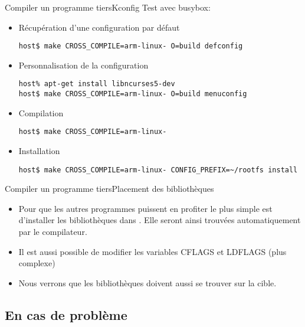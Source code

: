 \begin{frame}[fragile=singleslide]{Compiler un programme tiers}{Kconfig}
  Test avec busybox:
  \begin{itemize}
  \item Récupération d'une configuration par défaut
\begin{lstlisting}
host$ make CROSS_COMPILE=arm-linux- O=build defconfig
\end{lstlisting} %
  \item Personnalisation de la configuration
\begin{lstlisting}
host% apt-get install libncurses5-dev
host$ make CROSS_COMPILE=arm-linux- O=build menuconfig
\end{lstlisting} %
  \item Compilation
\begin{lstlisting}
host$ make CROSS_COMPILE=arm-linux-
\end{lstlisting} %
  \item Installation
\begin{lstlisting}
host$ make CROSS_COMPILE=arm-linux- CONFIG_PREFIX=~/rootfs install
\end{lstlisting} %
  \end{itemize}
\end{frame}

\begin{frame}{Compiler un programme tiers}{Placement des bibliothèques}
  \begin{itemize}
  \item Pour que les autres programmes puissent en profiter le plus simple est d'installer les bibliothèques dans . Elle seront ainsi trouvées automatiquement par le compilateur.
  \item Il est aussi possible de modifier les variables CFLAGS et LDFLAGS (plus complexe)
  \item Nous verrons que les bibliothèques doivent aussi se trouver sur la cible.
  \end{itemize}
\end{frame}

\subsection{En cas de problème}

